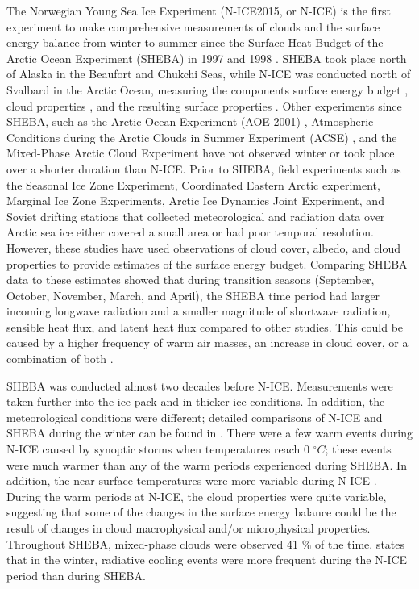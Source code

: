 The Norwegian Young Sea Ice Experiment (N-ICE2015, or N-ICE) \citep{granskog:2018} is the first experiment to make comprehensive measurements of clouds and the surface energy balance from winter to summer since the Surface Heat Budget of the Arctic Ocean Experiment (SHEBA) in 1997 and 1998 \citep{walden:2017, uttal:2002}. SHEBA took place north of Alaska in the Beaufort and Chukchi Seas, while N-ICE was conducted north of Svalbard in the Arctic Ocean, measuring the components surface energy budget \citep{persson:2002, andreas:2010, grachev:2007}, cloud properties \citep{turner:2005, turner:2002, intrieri:2002, shupe:2004}, and the resulting surface properties \citep{intrieri:2002, shupe:2004}. Other experiments since SHEBA, such as the Arctic Ocean Experiment (AOE-2001) \citep{tjernstrom:2005}, Atmospheric Conditions during the Arctic Clouds in Summer Experiment (ACSE) \citep{sotiropoulou:2016}, and the Mixed-Phase Arctic Cloud Experiment \citep{verlinde:2007} have not observed winter or took place over a shorter duration than N-ICE. Prior to SHEBA, field experiments such as the Seasonal Ice Zone Experiment, Coordinated Eastern Arctic experiment, Marginal Ice Zone Experiments, Arctic Ice Dynamics Joint Experiment, and Soviet drifting stations \citep{vihma:2005, kahl:1999} that collected meteorological and radiation data over Arctic sea ice either covered a small area or had poor temporal resolution. However, these studies have used observations of cloud cover, albedo, and cloud properties to provide estimates of the surface energy budget. Comparing SHEBA data to these estimates showed that during transition seasons (September, October, November, March, and April), the SHEBA time period had larger incoming longwave radiation and a smaller magnitude of shortwave radiation, sensible heat flux, and latent heat flux compared to other studies. This could be caused by a higher frequency of warm air masses, an increase in cloud cover, or a combination of both \citep{persson:2002}. 

SHEBA was conducted almost two decades before N-ICE. Measurements were taken further into the ice pack \citep{cohen:2017} and in thicker ice conditions. In addition, the meteorological conditions were different; detailed comparisons of N-ICE and SHEBA during the winter can be found in \citep{graham:2017}. There were a few warm events during N-ICE caused by synoptic storms when temperatures reach 0 $^{\circ} C$; these events were much warmer than any of the warm periods experienced during SHEBA. In addition, the near-surface temperatures were more variable during N-ICE \citep{cohen:2017}. During the warm periods at N-ICE, the cloud properties were quite variable, suggesting that some of the changes in the surface energy balance could be the result of changes in cloud macrophysical and/or microphysical properties. Throughout SHEBA, mixed-phase clouds were observed 41 $\%$ of the time. \citet{graham:2017} states that in the winter, radiative cooling events were more frequent during the N-ICE period than during SHEBA. 


